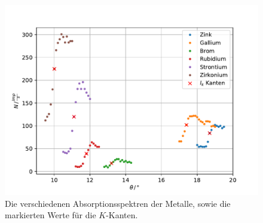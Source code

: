 \begin{figure}
  \centering
  \includegraphics[width=\textwidth]{content/data/verschmetalle.pdf}
  \caption{Die verschiedenen Absorptionsspektren der Metalle, sowie die markierten Werte für die $K$-Kanten.}
  \label{fig:versch}
\end{figure}

